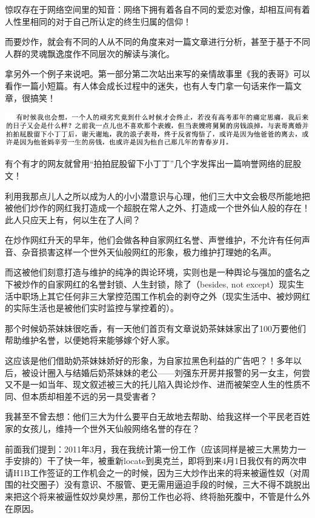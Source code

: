 \documentclass[9pt, b5paper]{article}
\begin{document}
惊叹存在于网络空间里的知音：网络下拥有着各自不同的爱恋对像，却相互间有着人性里相同的对于自己所认定的终生归属的信仰！

而要炒作，就会有不同的人从不同的角度来对一篇文章进行分析，甚至于基于不同人群的灵魂飘逸度作不同层次的解读与演化。

拿另外一个例子来说吧。第一部分第二次站出来写的亲情故事里《我的表哥》可以看作一篇小短篇。有人体会成长过程中的迷失，也有人专门拿一句话来作一篇文章，很搞笑！

\begin{center}
\includegraphics[width=.9\linewidth]{./pic/backups_plans_20210412_170341.png}
\end{center}

有个有才的网友就曾用“拍拍屁股留下小丁丁”几个字发挥出一篇响誉网络的屁股文！

利用我那点儿人之所以成为人的小小潜意识与心理，他们三大中文会极尽所能地把被他们炒作的网红我打造成一个超脱在常人之外、打造成一个世外仙人般的存在！此人只应天上有，何以生在了人间？

在炒作网红升天的早年，他们会做各种自家网红名誉、声誉维护，不允许有任何声音、杂音损害这样一个世外天仙般网红的形象，极力维护打理她的名声。

而这被他们刻意打造与维护的纯净的舆论环境，实则也是一种舆论与强加的盛名之下被炒作的自家网红的名誉封锁、人生封锁，除了（besides, not except）现实生活中职场上其它任何非三大掌控范围工作机会的剥夺之外（现实生活中、被炒网红的实际生活也是被他们实时监控与掌控着的）。

那个时候奶茶妹妹很吃香，有一天他们首页有文章说奶茶妹妹家出了100万要他们帮助维护名誉，以便她将来能够嫁个好人家。

这应该是他们借助奶茶妹妹娇好的形象，为自家拉黑色利益的广告吧？！多年以后，被设计圈入与结婚后奶茶妹妹的老公——刘强东开房并报警的另一女主，何尝又不是一如当年、现文叙述被三大的托儿陷入舆论炒作、进而被架空人生的性质不同、但本质却相差不远的另一具受害者？

我甚至不曾去想：他们三大为什么要平白无故地去帮助、给我这样一个平民老百姓家的女孩儿，维持一个世外天仙般网络名誉的存在？

前面我们提到：2011年3月，我在我统计第一份工作（应该同样是被三大黑势力一手安排的）干了快一年，被重新locate到奥克兰，即将到来4月1日我仅有的两次申请H1B工作签证的工作机会之一的时候，因为三大炒作出来的将来被逼性奴（对周围的社交圈子）没有意识、不服管、更无需用逼迫手段的时候，三大不得不跳脱出来把这个将来被逼性奴炒臭炒黑，那份工作也必将、终将胎死腹中，不管是什么外在原因。
\end{document}
